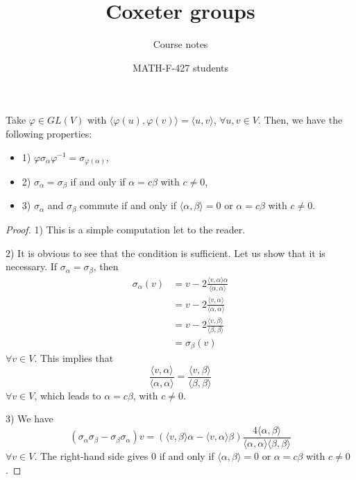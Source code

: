 \documentclass[envcountsame,envcountchap]{svmono}
\begin{document}
\author{MATH-F-427 students}
\title{Coxeter groups}
\subtitle{Course notes}
\maketitle

\frontmatter%

\tableofcontents


\mainmatter%

\begin{proposition}
Take $\varphi \in GL(V)$ with $\langle \varphi (u), \varphi (v) \rangle = \langle u, v \rangle$, $\forall u, v \in V$. Then, we have the following properties:
\begin{itemize}
\item 1) $\varphi \sigma_\alpha \varphi^{-1} = \sigma_{\varphi (\alpha) }$,
\item 2) $\sigma_\alpha = \sigma_\beta$ if and only if $\alpha = c \beta$ with $c \neq 0$,
\item 3) $\sigma_\alpha$ and $\sigma_\beta$ commute if and only if $\langle \alpha , \beta \rangle = 0$ or $\alpha = c \beta$ with $c\neq 0$. 
\end{itemize}
\end{proposition}
  
\begin{proof}
1) This is a simple computation let to the reader.

2) It is obvious to see that the condition is sufficient. Let us show that it is necessary. If $\sigma_\alpha = \sigma_\beta$, then 
\begin{equation}
\begin{split}
\sigma_\alpha (v) &= v  - 2\frac{ \langle v, \alpha \rangle \alpha}{\langle \alpha, \alpha \rangle} \\
&= v - 2 \frac{\langle v, \alpha \rangle}{\langle \alpha, \alpha \rangle} \\
&= v - 2 \frac{\langle v, \beta \rangle}{\langle \beta, \beta \rangle} \\
&= \sigma_\beta (v)
\end{split}
\end{equation} $\forall v \in V$. This implies that
\begin{equation}
\frac{\langle v, \alpha \rangle}{\langle \alpha, \alpha \rangle} = \frac{\langle v, \beta \rangle}{\langle \beta, \beta \rangle}
\end{equation} $\forall v \in V$, which leads to $\alpha = c\beta$, with $c\neq 0$.

3) We have 
\begin{equation}
(\sigma_\alpha \sigma_\beta - \sigma_\beta \sigma_\alpha ) v =  ( \langle v , \beta \rangle \alpha - \langle v , \alpha \rangle \beta ) \frac{4 \langle \alpha, \beta \rangle}{\langle \alpha, \alpha \rangle \langle \beta , \beta \rangle} 
\end{equation} $\forall v \in V$. The right-hand side gives $0$ if and only if $\langle \alpha , \beta \rangle = 0$ or $\alpha = c \beta$ with $c \neq 0$. 

\end{proof}
\end{document}
